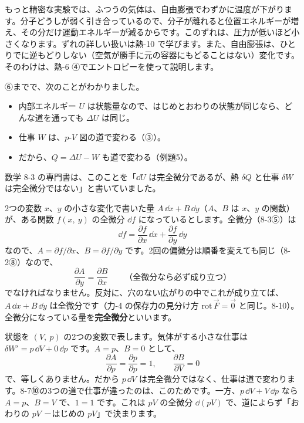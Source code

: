 \begin{seikaku}
もっと精密な実験では、ふつうの気体は、自由膨張でわずかに温度が下がります。分子どうしが弱く引き合っているので、分子が離れると位置エネルギーが増え、その分だけ運動エネルギーが減るからです。このずれは、圧力が低いほど小さくなります。ずれの詳しい扱いは熱-10 で学びます。また、自由膨張は、ひとりでに逆もどりしない（空気が勝手に元の容器にもどることはない）変化です。そのわけは、熱-6 ④でエントロピーを使って説明します。
\end{seikaku}

\label{ph:熱-2:sec7}
⑥までで、次のことがわかりました。
\begin{itemize}[leftmargin=1.6\zw, itemsep=0pt, topsep=2pt]
\item 内部エネルギー $U$ は状態量なので、はじめとおわりの状態が同じなら、どんな道を通っても $\Delta U$ は同じ。
\item 仕事 $W$ は、$p$-$V$ 図の道で変わる（③）。
\item だから、$Q=\Delta U-W$ も道で変わる（例題5）。
\end{itemize}
数学 8-3 の専門書は、このことを「$\dd U$ は完全微分であるが、熱 $\delta Q$ と仕事 $\delta W$ は完全微分ではない」と書いていました。

2つの変数 $x$、$y$ の小さな変化で書いた量 $A\,\dd x+B\,\dd y$（$A$、$B$ は $x$、$y$ の関数）が、ある関数 $f(x,\ y)$ の全微分 $\dd f$ になっているとします。全微分（8-3⑤）は
\[\dd f=\frac{\partial f}{\partial x}\,\dd x+\frac{\partial f}{\partial y}\,\dd y\]
なので、$A=\partial f/\partial x$、$B=\partial f/\partial y$ です。2回の偏微分は順番を変えても同じ（8-2⑧）なので、
\[\frac{\partial A}{\partial y}=\frac{\partial B}{\partial x}\qquad\text{（全微分なら必ず成り立つ）}\]
でなければなりません。反対に、穴のない広がりの中でこれが成り立てば、$A\,\dd x+B\,\dd y$ は全微分です（力-4 の保存力の見分け方 $\mathrm{rot}\,\vec F=\vec 0$ と同じ。8-10）。全微分になっている量を\textbf{完全微分}といいます。

状態を $(V,\ p)$ の2つの変数で表します。気体がする小さな仕事は $\delta W'=p\,\dd V+0\,\dd p$ です。$A=p$、$B=0$ として、
\[\frac{\partial A}{\partial p}=\frac{\partial p}{\partial p}=1,\qquad \frac{\partial B}{\partial V}=0\]
で、等しくありません。だから $p\,\dd V$ は完全微分ではなく、仕事は道で変わります。8-7⑩の3つの道で仕事が違ったのは、このためです。一方、$p\,\dd V+V\,\dd p$ なら $A=p$、$B=V$ で、$1=1$ です。これは $pV$ の全微分 $\dd(pV)$ で、道によらず「おわりの $pV$ －はじめの $pV$」で決まります。

